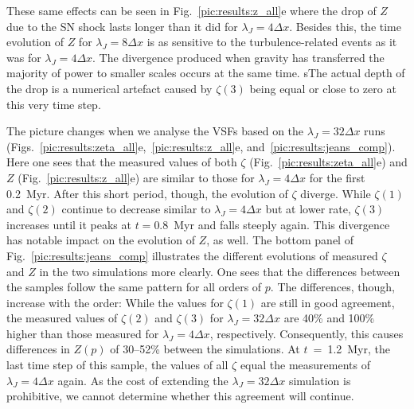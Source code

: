 These same effects can be seen in Fig.~\ref{pic:results:z_all}e where the drop of $Z$ due to the SN shock lasts longer than it did for $\lambda_J = 4\Delta{}x$. 
Besides this, the time evolution of $Z$ for $\lambda_J = 8\Delta{}x$ is as sensitive to the turbulence-related events as it was for $\lambda_J = 4\Delta{}x$.
The divergence produced when gravity has transferred the majority of power to smaller scales occurs at the same time. 
sThe actual depth of the drop is a numerical artefact caused by $\zeta(3)$ being equal or close to zero at this very time step. 

The picture changes when we analyse the VSFs based on the $\lambda_J = 32\Delta{}x$ runs (Figs.~\ref{pic:results:zeta_all}e,~\ref{pic:results:z_all}e, and~\ref{pic:results:jeans_comp}).
Here one sees that the measured values of both $\zeta$ (Fig.~\ref{pic:results:zeta_all}e) and $Z$ (Fig.~\ref{pic:results:z_all}e) are similar to those for $\lambda_J = 4\Delta{}x$ for the first 0.2~Myr.
After this short period, though, the evolution of $\zeta$ diverge. 
While $\zeta(1)$ and $\zeta(2)$ continue to decrease similar to $\lambda_J = 4\Delta{}x$ but at lower rate, $\zeta(3)$ increases until it peaks at $t=0.8$~Myr and falls steeply again.
This divergence has notable impact on the evolution of $Z$, as well. 
The bottom panel of Fig.~\ref{pic:results:jeans_comp} illustrates the different evolutions of measured $\zeta$ and $Z$ in the two simulations more clearly.
One sees that the differences between the samples follow the same pattern for all orders of $p$.
The differences, though, increase with the order:
While the values for $\zeta(1)$ are still in good agreement, the measured values of $\zeta(2)$ and $\zeta(3)$ for $\lambda_J = 32\Delta{}x$ are 40\% and 100\% higher than those measured for $\lambda_J = 4\Delta{}x$, respectively.
Consequently, this causes differences in $Z(p)$ of 30--52\% between the simulations.
At $t$~=~1.2~Myr, the last time step of this sample, the values of all $\zeta$ equal the measurements of $\lambda_J = 4\Delta{}x$ again.
As the cost of extending the $\lambda_J = 32\Delta{}x$ simulation is prohibitive, we cannot determine whether this agreement will continue.

